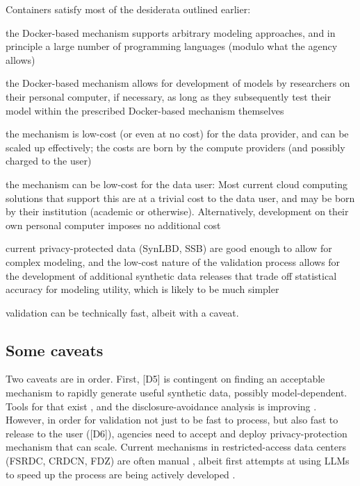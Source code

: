 \documentclass[inline]{hdsr}
\begin{document}
Containers satisfy most of the desiderata outlined earlier: 
\begin{enumerate*}[label={[D\arabic*]}, itemjoin={{; }}, itemjoin*={{, and }}]
    \item the Docker-based mechanism supports arbitrary modeling approaches, and in principle a large number of programming languages (modulo what the agency allows)
    \item the Docker-based mechanism  allows for development of models by researchers on their personal computer, if necessary, as long as they subsequently test their model within the prescribed Docker-based mechanism themselves
    \item the mechanism is low-cost (or even at no cost) for the data provider, and can be scaled up effectively; the costs are born by the compute providers (and possibly charged to the user)
    \item the mechanism can be low-cost for the data user: Most current cloud computing solutions that support this are at a trivial cost to the data user, and may be born by their institution (academic or otherwise). Alternatively, development on their own personal computer imposes no additional cost
    \item current privacy-protected data (SynLBD, SSB) are  good enough to allow for complex modeling, and the low-cost nature of the validation process allows for the development of additional synthetic data releases that trade off statistical accuracy for modeling utility, which is likely to be much simpler
    \item validation can be technically fast, albeit with a caveat.
\end{enumerate*}

\subsection{Some caveats}

Two caveats are in order. First, [D5] is contingent on finding an acceptable mechanism to rapidly generate useful synthetic data, possibly model-dependent. Tools for that exist \citep{synthpop,synthpop2016}, and the disclosure-avoidance analysis is improving \citep{SnokeEtAl2017}. However, in order for validation not just to be fast to process, but also fast to release to the user ([D6]), agencies need to accept and deploy privacy-protection mechanism that can scale. Current mechanisms in restricted-access data centers (\ac{FSRDC}, \ac{CRDCN}, \ac{FDZ}) are often manual \citep{brandt_guidelines_2010}, albeit first attempts at using \acp{LLM} to speed up the process are being actively developed \citep{rigaud_checking_2023}.
\end{document}

